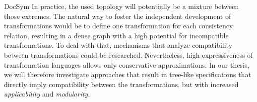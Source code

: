 \begin{copiedFrom}{DocSym}
In practice, the used topology will potentially be a mixture between those extremes.
The natural way to foster the independent development of transformations %
would be to define one transformation for each consistency relation, resulting in a dense graph with a high potential for incompatible transformations.
To deal with that, mechanisms that analyze compatibility between transformations could be researched.
Nevertheless, high expressiveness of transformation languages allows only conservative approximations. %
In our thesis, we will therefore investigate approaches that result in tree-like specifications that directly imply compatibility between the transformations, but with increased \emph{applicability} and \emph{modularity}. %








\end{copiedFrom}
